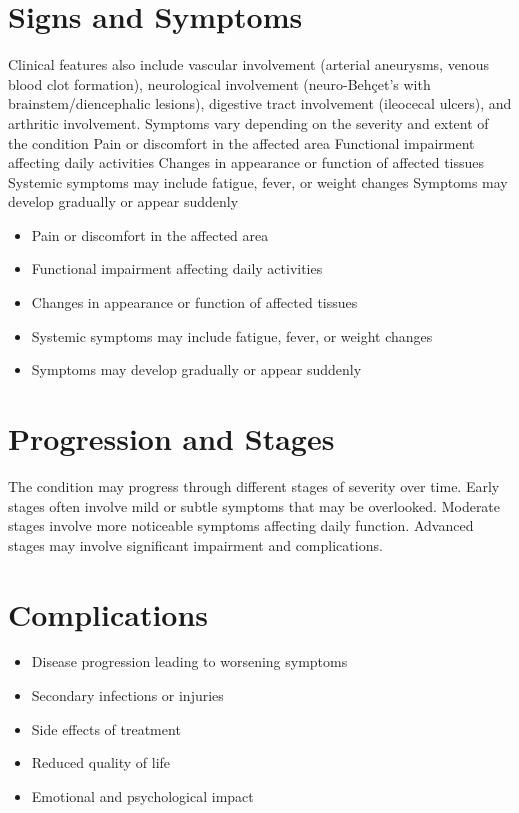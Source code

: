 \section{Signs and Symptoms}
Clinical features also include vascular involvement (arterial aneurysms, venous blood clot formation), neurological involvement (neuro-Behçet's with brainstem/diencephalic lesions), digestive tract involvement (ileocecal ulcers), and arthritic involvement. Symptoms vary depending on the severity and extent of the condition Pain or discomfort in the affected area Functional impairment affecting daily activities Changes in appearance or function of affected tissues Systemic symptoms may include fatigue, fever, or weight changes Symptoms may develop gradually or appear suddenly

\begin{itemize}[noitemsep]
  \item Pain or discomfort in the affected area
  \item Functional impairment affecting daily activities
  \item Changes in appearance or function of affected tissues
  \item Systemic symptoms may include fatigue, fever, or weight changes
  \item Symptoms may develop gradually or appear suddenly
\end{itemize}
\section{Progression and Stages}
The condition may progress through different stages of severity over time. Early stages often involve mild or subtle symptoms that may be overlooked. Moderate stages involve more noticeable symptoms affecting daily function. Advanced stages may involve significant impairment and complications.
\section{Complications}
\begin{itemize}[noitemsep]
  \item Disease progression leading to worsening symptoms
  \item Secondary infections or injuries
  \item Side effects of treatment
  \item Reduced quality of life
  \item Emotional and psychological impact
\end{itemize}
